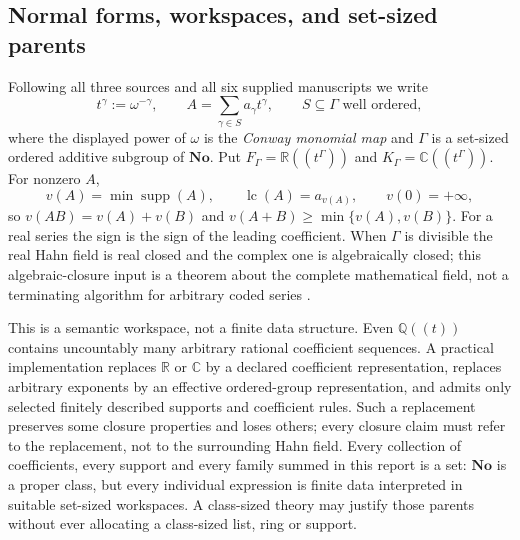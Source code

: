 \documentclass[11pt,letterpaper]{article}
\numberwithin{equation}{section}
\theoremstyle{definition}
\theoremstyle{remark}
\newcommand{\No}{\mathbf{No}}
\newcommand{\R}{\mathbb R}
\newcommand{\C}{\mathbb C}
\newcommand{\Q}{\mathbb Q}
\newcommand{\supp}{\operatorname{supp}}
\newcommand{\lc}{\operatorname{lc}}
\begin{document}
\subsection{Normal forms, workspaces, and set-sized parents}
\label{cas:sub-workspaces}
Following all three sources and all six supplied manuscripts we write
\begin{equation}\label{cas:eq-normal}
 t^\gamma:=\omega^{-\gamma},\qquad
 A=\sum_{\gamma\in S}a_\gamma t^\gamma,\qquad
 S\subseteq\Gamma\text{ well ordered},
\end{equation}
where the displayed power of $\omega$ is the \emph{Conway monomial map} and
$\Gamma$ is a set-sized ordered additive subgroup of $\No$. Put
$F_\Gamma=\R((t^\Gamma))$ and $K_\Gamma=\C((t^\Gamma))$. For nonzero $A$,
\[
 v(A)=\min\supp(A),\qquad \lc(A)=a_{v(A)},\qquad v(0)=+\infty,
\]
so $v(AB)=v(A)+v(B)$ and $v(A+B)\ge\min\{v(A),v(B)\}$. For a real series the
sign is the sign of the leading coefficient. When $\Gamma$ is divisible the real
Hahn field is real closed and the complex one is algebraically closed; this
algebraic-closure input is a theorem about the complete mathematical field, not
a terminating algorithm for arbitrary coded series
\cite[Corollary 4]{cas:Poonen}.

This is a semantic workspace, not a finite data structure. Even $\Q((t))$
contains uncountably many arbitrary rational coefficient sequences. A practical
implementation replaces $\R$ or $\C$ by a declared coefficient representation,
replaces arbitrary exponents by an effective ordered-group representation, and
admits only selected finitely described supports and coefficient rules. Such a
replacement preserves some closure properties and loses others; every closure
claim must refer to the replacement, not to the surrounding Hahn field. Every
collection of coefficients, every support and every family summed in this report
is a set: $\No$ is a proper class, but every individual expression is finite
data interpreted in suitable set-sized workspaces. A class-sized theory may
justify those parents without ever allocating a class-sized list, ring or
support.
\end{document}
